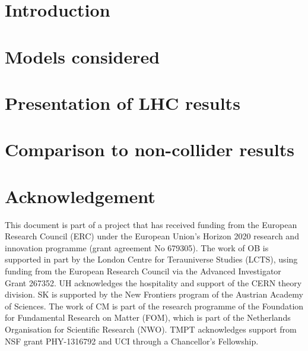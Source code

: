 \documentclass[a4paper, 11pt,notoc]{article}
\begin{document}
\maketitle

\section{Introduction}
%


\section{Models considered}
\label{sec:models}
%


\section{Presentation of LHC results}
\label{sec:colliderresults}
%


\section{Comparison to non-collider results}
\label{sec:comparisontonon-colliderresults}
%


\section{Acknowledgement} 
This document is part of a project that has received funding from the European Research Council (ERC) under the European Union's Horizon 2020 research and innovation programme (grant agreement No 679305). The work of OB is supported in part by the London Centre for Terauniverse Studies (LCTS), using funding from the European Research Council via the Advanced Investigator Grant 267352. UH acknowledges the hospitality and support of the CERN theory division.  SK is supported by the New Frontiers program of the Austrian Academy of Sciences.  The work of CM is part of the research programme of the Foundation for Fundamental Research on Matter (FOM), which is part of the Netherlands Organisation for Scientific Research (NWO). TMPT acknowledges support from NSF grant PHY-1316792 and UCI through a Chancellor's Fellowship. 
\end{document}
